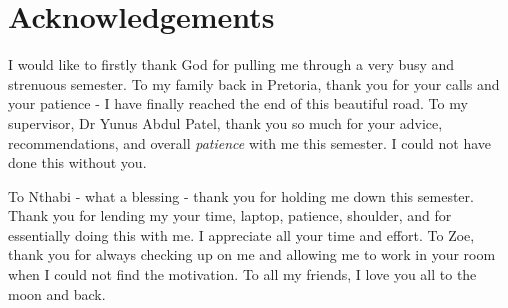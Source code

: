\documentclass[class=report,11pt,crop=false]{standalone}
\begin{document}
\chapter*{Acknowledgements}
\vspace{0.3cm}

I would like to firstly thank God for pulling me through a very busy and strenuous semester. To my family back in Pretoria, thank you for your calls and your patience - I have finally reached the end of this beautiful road. To my supervisor, Dr Yunus Abdul Patel, thank you so much for your advice, recommendations, and overall \emph{patience} with me this semester. I could not have done this without you.

To Nthabi - what a blessing - thank you for holding me down this semester. Thank you for lending my your time, laptop, patience, shoulder, and for essentially doing this with me. I appreciate all your time and effort. To Zoe, thank you for always checking up on me and allowing me to work in your room when I could not find the motivation. To all my friends, I love you all to the moon and back.
\end{document}
